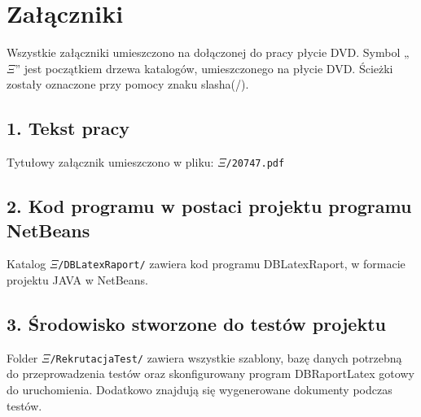 \documentclass[a4paper,onecolumn,twoside,12pt,wide,floatssmall]{mwrep}
\begin{document}
\renewcommand*\lstlistingname{Wydruk}
\renewcommand*\lstlistlistingname{Spis wydruków}

\renewcommand{\baselinestretch}{1.0}
\raggedbottom



\newpage

\makeatletter
\def\ps@plain{%
  \let\@mkboth\@gobbletwo
  \let\ps@normal\hf@plain
  \let\ps@opening\hf@plain
  \let\ps@closing\hf@plain
  \let\ps@blank\hf@empty
  \ps@normal}
\makeatother
{}
\setcounter{page}{3}
\pagestyle{plain}
\tableofcontents










\listoffigures
\chapter*{Załączniki}
\hspace{3mm} Wszystkie załączniki umieszczono na dołączonej do pracy płycie DVD. Symbol
„$\Xi$” jest początkiem drzewa katalogów, umieszczonego na
płycie DVD. Ścieżki zostały oznaczone przy pomocy znaku slasha(/).
\section{1. \hspace{1mm}Tekst pracy}

\hspace{3mm} Tytułowy załącznik umieszczono w pliku: \texttt{$\Xi$/20747.pdf}

\section{2. \hspace{1mm}Kod programu w postaci projektu programu NetBeans}

\hspace{3mm} Katalog  \texttt{$\Xi$/DBLatexRaport/} zawiera kod programu DBLatexRaport, w formacie projektu JAVA w NetBeans.

\section{3. \hspace{1mm}Środowisko stworzone do testów projektu}
\hspace{3mm}  Folder \texttt{$\Xi$/RekrutacjaTest/} zawiera wszystkie szablony, bazę danych potrzebną do przeprowadzenia testów oraz  skonfigurowany program DBRaportLatex gotowy do uruchomienia. Dodatkowo znajdują się wygenerowane dokumenty podczas testów.
\end{document}
